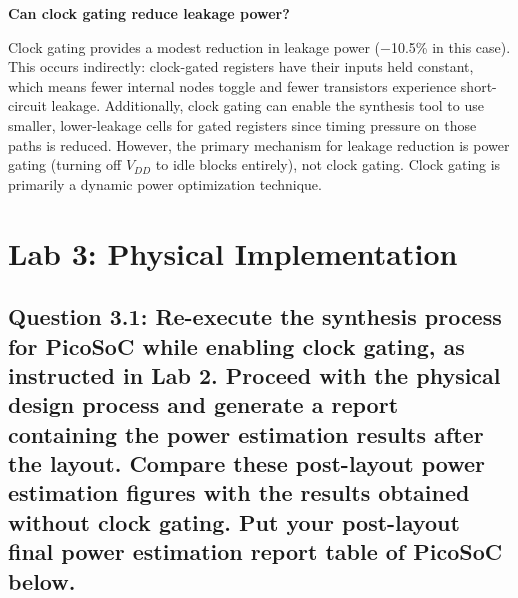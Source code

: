 \documentclass{article}
\begin{document}
\begin{tcolorbox}[colback=white, colframe=black, width=\textwidth, title=Answer 2.3]
\vspace{0.2cm}

\textbf{Can clock gating reduce leakage power?}

Clock gating provides a modest reduction in leakage power ($-$10.5\% in this case). This occurs indirectly: clock-gated registers have their inputs held constant, which means fewer internal nodes toggle and fewer transistors experience short-circuit leakage. Additionally, clock gating can enable the synthesis tool to use smaller, lower-leakage cells for gated registers since timing pressure on those paths is reduced. However, the primary mechanism for leakage reduction is power gating (turning off $V_{DD}$ to idle blocks entirely), not clock gating. Clock gating is primarily a dynamic power optimization technique.

\end{tcolorbox}

\newpage

\section{Lab 3: Physical Implementation}


\subsection*{Question 3.1: Re-execute the synthesis process for PicoSoC while enabling clock gating, as instructed in Lab 2. Proceed with the physical design process and generate a report containing the power estimation results after the layout. Compare these post-layout power estimation figures with the results obtained without clock gating. Put your post-layout final power estimation report table of PicoSoC below.}
\end{document}

